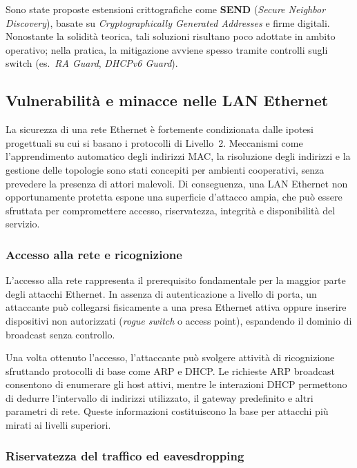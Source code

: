 Sono state proposte estensioni crittografiche come \textbf{SEND} (\emph{Secure Neighbor Discovery}),
basate su \emph{Cryptographically Generated Addresses} e firme digitali.
Nonostante la solidità teorica, tali soluzioni risultano poco adottate in ambito operativo;
nella pratica, la mitigazione avviene spesso tramite controlli sugli switch
(es.\ \emph{RA Guard}, \emph{DHCPv6 Guard}).

\subsection{Vulnerabilità e minacce nelle LAN Ethernet}

La sicurezza di una rete Ethernet è fortemente condizionata dalle ipotesi progettuali
su cui si basano i protocolli di Livello~2.
Meccanismi come l’apprendimento automatico degli indirizzi MAC, la risoluzione degli indirizzi
e la gestione delle topologie sono stati concepiti per ambienti cooperativi,
senza prevedere la presenza di attori malevoli.
Di conseguenza, una LAN Ethernet non opportunamente protetta espone una superficie d’attacco ampia,
che può essere sfruttata per compromettere accesso, riservatezza, integrità e disponibilità del servizio.

\subsubsection{Accesso alla rete e ricognizione}

L’accesso alla rete rappresenta il prerequisito fondamentale per la maggior parte degli attacchi Ethernet.
In assenza di autenticazione a livello di porta, un attaccante può collegarsi fisicamente
a una presa Ethernet attiva oppure inserire dispositivi non autorizzati
(\emph{rogue switch} o access point), espandendo il dominio di broadcast senza controllo.

Una volta ottenuto l’accesso, l’attaccante può svolgere attività di ricognizione sfruttando
protocolli di base come ARP e DHCP.
Le richieste ARP broadcast consentono di enumerare gli host attivi,
mentre le interazioni DHCP permettono di dedurre l’intervallo di indirizzi utilizzato,
il gateway predefinito e altri parametri di rete.
Queste informazioni costituiscono la base per attacchi più mirati ai livelli superiori.

\subsubsection{Riservatezza del traffico ed eavesdropping}

